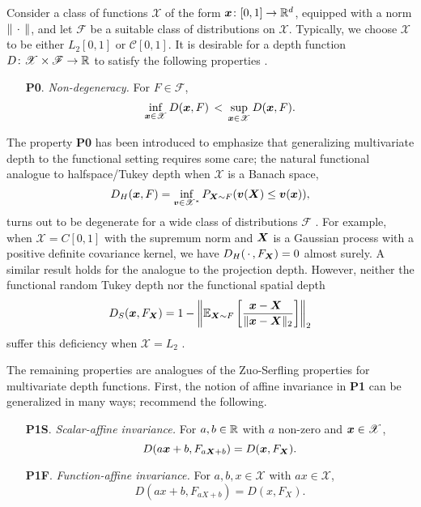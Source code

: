 Consider a class of functions $\mathscr{X}$ of the form $\bm{x}\colon [0, 1] \to
\mathbb{R}^d$, equipped with a norm $\Vert \,\cdot\, \Vert$, and let $\mathscr{F}$ be a
suitable class of distributions on $\mathscr{X}$.
Typically, we choose $\mathscr{X}$ to be either $L_2[0, 1]$ or $\mathcal{C}[0,
1]$.
It is desirable for a depth function $D\colon \mathscr{X} \times \mathscr{F}
\to \mathbb{R}$ to satisfy the following properties \parencite{gijbels-nagy-2017}.

\begin{enumerate}
    \item[\textbf{P0}.] \emph{Non-degeneracy.}
    For $F \in \mathscr{F}$,
    \begin{equation}
        \inf_{\bm{x} \in \mathscr{X}} D(\bm{x}, F) \,<\,
        \sup_{\bm{x} \in \mathscr{X}} D(\bm{x}, F).
    \end{equation}
\end{enumerate}

The property \textbf{P0} has been introduced to emphasize that generalizing
multivariate depth to the functional setting requires some care; the natural
functional analogue to halfspace/Tukey depth when $\mathscr{X}$ is a Banach
space,
\begin{equation}
    D_H(\bm{x}, F) = \inf_{\bm{v} \in \mathscr{X}^*} P_{\bm{X} \sim F}(\bm{v}(\bm{X}) \leq \bm{v}(\bm{x})),
\end{equation}
turns out to be degenerate for a wide class of distributions $\mathscr{F}$
\parencite{chakraborty-chaudhuri-2014a}.
For example, when $\mathscr{X} = C[0, 1]$ with the supremum norm and $\bm{X}$ is
a Gaussian process with a positive definite covariance kernel, we have
$D_H(\,\cdot\,, F_{\bm{X}}) = 0$ almost surely.
A similar result holds for the analogue to the projection depth.
However, neither the functional random Tukey depth nor the functional spatial
depth
\begin{equation}
    D_S(\bm{x}, F_{\bm{X}}) = 1 - \left\Vert \operatorname{\mathbb{E}}_{\bm{X} \sim F} \left[\frac{\bm{x} - \bm{X}\;\,}{\Vert \bm{x} - \bm{X} \Vert_2}\right] \right\Vert_2
\end{equation}
suffer this deficiency when $\mathscr{X} = L_2$
\parencite{albertos-reyes-2008a, gijbels-nagy-2017}.


The remaining properties are analogues of the Zuo-Serfling properties for
multivariate depth functions.
First, the  notion of affine invariance in \textbf{P1} can be generalized in
many ways; \textcite{gijbels-nagy-2017} recommend the following.

\begin{enumerate}
    \item[\textbf{P1S}.] \emph{Scalar-affine invariance.}
    For $a, b \in \mathbb{R}$ with $a$ non-zero and $\bm{x} \in \mathscr{X}$,
    \begin{equation}
        D(a\bm{x} + b, F_{a\bm{X} + b}) = D(\bm{x}, F_{\bm{X}}).
    \end{equation}

    \item[\textbf{P1F}.] \emph{Function-affine invariance.}
    For $a, b, x \in \mathscr{X}$ with $ax \in \mathscr{X}$,
    \begin{equation}
        D(ax + b, F_{aX + b}) = D(x, F_{X}).
    \end{equation}
\end{enumerate}


